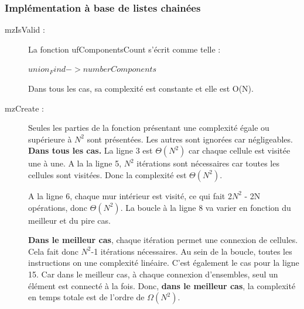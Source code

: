 \documentclass[10pt]{article}
\begin{document}
\subsubsection{Implémentation à base de listes chainées}
\begin{description}
\item[mzIsValid :]La fonction ufComponentsCount s'écrit comme telle :
\begin{codebox}
\li \Return $union_Find->numberComponents$
\end{codebox}
Dans tous les cas, sa complexité est constante et elle est O(N).

\item[mzCreate :] Seules les parties de la fonction présentant une complexité égale ou supérieure à $N^{2}$ sont présentées. Les autres sont ignorées car négligeables. \textbf{Dans tous les cas.} La ligne 3 est $\Theta(N^{2})$ car chaque cellule est visitée une à une. A la la ligne 5, $N^{2}$ itérations sont nécessaires car toutes les cellules sont visitées. Donc la complexité est $\Theta(N^{2})$.

A la ligne 6, chaque mur intérieur est visité, ce qui fait 2$N^{2}$ - 2N opérations, donc $\Theta(N^{2})$.
La boucle à la ligne 8 va varier en fonction du meilleur et du pire cas. 

\textbf{Dans le meilleur cas}, chaque itération permet une connexion de cellules. Cela fait donc $N^{2}$-1 itérations nécessaires. Au sein de la boucle, toutes les instructions on une complexité linéaire. C'est également le cas pour la ligne 15. Car dans le meilleur cas, à chaque connexion d'ensembles, seul un élément est connecté à la fois. Donc,\textbf{ dans le meilleur cas}, la complexité en temps totale est de l'ordre de $\Omega(N^{2})$. 


\end{description}
\end{document}

